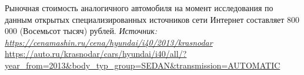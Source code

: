 \vspace{3mm}

Рыночная стоимость аналогичного автомобиля на момент исследования по данным открытых специализированных источников сети Интернет  составляет 800 000 (Восемьсот тысяч) рублей.
\textit{Источник: \url{https://cenamashin.ru/cena/hyundai/i40/2013/krasnodar}}\\	
\url{https://auto.ru/krasnodar/cars/hyundai/i40/all/?year\_from=2013\&body\_typ\_group=SEDAN\&transmission=AUTOMATIC}
\vspace{3mm}
%




